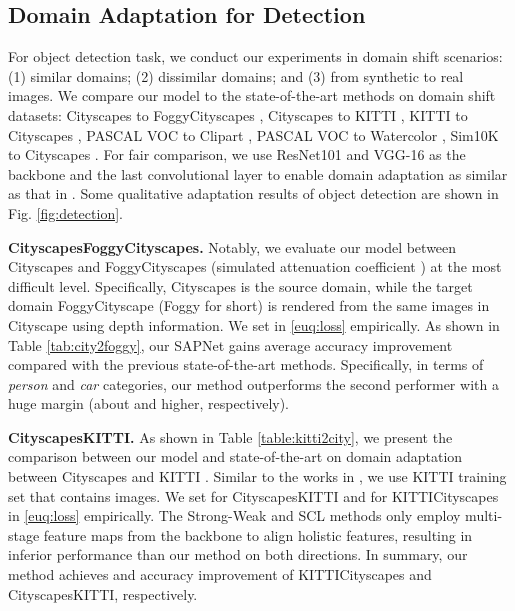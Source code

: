 \documentclass[runningheads]{llncs}
\begin{document}
\subsection{Domain Adaptation for Detection}
For object detection task, we conduct our experiments in  domain shift scenarios: (1) similar domains; (2) dissimilar domains; and (3) from synthetic to real images. We compare our model to the state-of-the-art methods on  domain shift datasets: Cityscapes \cite{DBLP:conf/cvpr/CordtsORREBFRS16} to FoggyCityscapes \cite{DBLP:journals/ijcv/SakaridisDG18}, Cityscapes \cite{DBLP:conf/cvpr/CordtsORREBFRS16} to KITTI \cite{DBLP:conf/cvpr/GeigerLU12}, KITTI \cite{DBLP:conf/cvpr/GeigerLU12} to Cityscapes \cite{DBLP:conf/cvpr/CordtsORREBFRS16}, PASCAL VOC \cite{DBLP:journals/ijcv/EveringhamGWWZ10} to Clipart \cite{DBLP:conf/cvpr/InoueFYA18}, PASCAL VOC \cite{DBLP:journals/ijcv/EveringhamGWWZ10} to Watercolor \cite{DBLP:conf/cvpr/InoueFYA18}, Sim10K \cite{DBLP:conf/icra/Johnson-Roberson17} to Cityscapes \cite{DBLP:conf/cvpr/CordtsORREBFRS16}. For fair comparison, we use ResNet101 and VGG-16 as the backbone and the last convolutional layer to enable domain adaptation as similar as that in \cite{DBLP:conf/cvpr/SaitoUHS19,DBLP:journals/corr/abs-1911-02559}. Some qualitative adaptation results of object detection are shown in Fig. \ref{fig:detection}.

{\flushleft \textbf{CityscapesFoggyCityscapes.}} Notably, we evaluate our model between Cityscapes \cite{DBLP:conf/cvpr/CordtsORREBFRS16} and FoggyCityscapes \cite{DBLP:journals/ijcv/SakaridisDG18} (simulated attenuation coefficient ) at the most difficult level. Specifically, Cityscapes is the source domain, while the target domain FoggyCityscape (Foggy for short) is rendered from the same images in Cityscape using depth information. We set  in \eqref{euq:loss} empirically. As shown in Table \ref{tab:city2foggy}, our SAPNet gains  average accuracy improvement compared with the previous state-of-the-art methods. Specifically, in terms of \textit{person} and \textit{car} categories, our method outperforms the second performer with a huge margin (about  and  higher, respectively).

{\flushleft \textbf{CityscapesKITTI.}} As shown in Table \ref{table:kitti2city}, we present the comparison between our model and state-of-the-art on domain adaptation between Cityscapes \cite{DBLP:conf/cvpr/CordtsORREBFRS16} and KITTI \cite{DBLP:conf/cvpr/GeigerLU12}. Similar to the works in \cite{DBLP:conf/cvpr/Chen0SDG18,DBLP:journals/corr/abs-1911-02559}, we use KITTI training set that contains  images. We set  for CityscapesKITTI and  for KITTICityscapes in \eqref{euq:loss} empirically. The Strong-Weak and SCL \cite{DBLP:journals/corr/abs-1911-02559} methods only employ multi-stage feature maps from the backbone to align holistic features, resulting in inferior performance than our method on both directions. In summary, our method achieves  and  accuracy improvement of KITTICityscapes and CityscapesKITTI, respectively.
\end{document}
